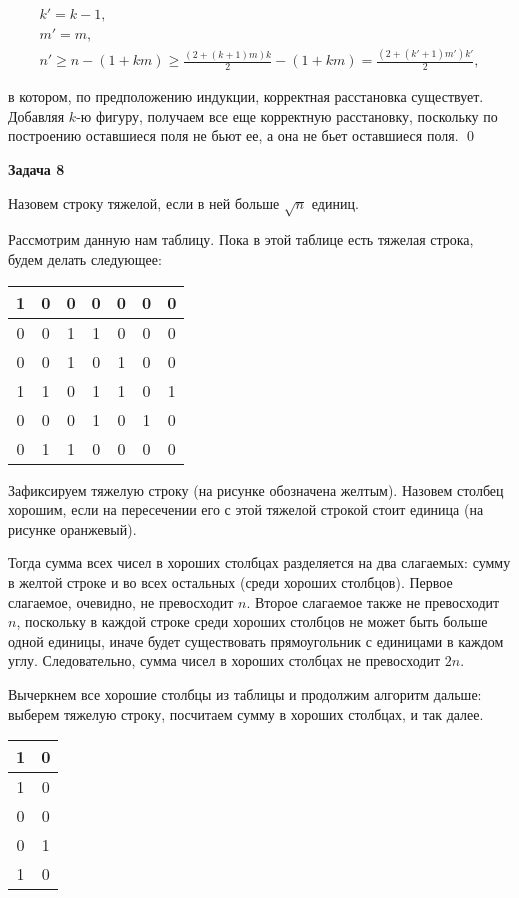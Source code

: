 		\begin{gather*}
			k' = k - 1, \\
			m' = m, \\
			n' \ge n - (1+km) \ge \frac{(2+(k+1)m)k}{2} - (1+km) = \frac{(2+(k'+1)m')k'}{2},
		\end{gather*}

		в котором, по предположению индукции, корректная расстановка существует. Добавляя $k$-ю фигуру, получаем все еще корректную расстановку, поскольку по построению оставшиеся поля не бьют ее, а она не бьет оставшиеся поля. \qed


	\begin{center}
    \textbf{Задача 8}
\end{center}
		Назовем строку тяжелой, если в ней больше $\sqrt{n}$ единиц.

		Рассмотрим данную нам таблицу. Пока в этой таблице есть тяжелая строка, будем делать следующее:

		\begin{tabular}{|c|c|c|c|c|c|c|}
			\hline
			1 & 0 & 0 & 0 & 0 & 0 & 0 \\
			\hline
			0 & 0 & 1 & 1 & 0 & 0 & 0 \\
			\hline
			0 & 0 & 1 & 0 & 1 & 0 & 0 \\
			\hline
			\rowcolor{yellow}
			1 & 1 & 0 & 1 & 1 & 0 & 1 \\
			\hline
			0 & 0 & 0 & 1 & 0 & 1 & 0 \\
			\hline
			0 & 1 & 1 & 0 & 0 & 0 & 0 \\
			\hline
		\end{tabular}

		Зафиксируем тяжелую строку (на рисунке обозначена желтым). Назовем столбец хорошим, если на пересечении его с этой тяжелой строкой стоит единица (на рисунке оранжевый).

		Тогда сумма всех чисел в хороших столбцах разделяется на два слагаемых: сумму в желтой строке и во всех остальных (среди хороших столбцов). Первое слагаемое, очевидно, не превосходит $n$. Второе слагаемое также не превосходит $n$, поскольку в каждой строке среди хороших столбцов не может быть больше одной единицы, иначе будет существовать прямоугольник с единицами в каждом углу. Следовательно, сумма чисел в хороших столбцах не превосходит $2n$.

		Вычеркнем все хорошие столбцы из таблицы и продолжим алгоритм дальше: выберем тяжелую строку, посчитаем сумму в хороших столбцах, и так далее.

		\begin{tabular}{|c|c|}
			\hline
			1 & 0 \\
			\hline
			1 & 0 \\
			\hline
			\rowcolor{yellow}
			0 & 0 \\
			\hline
			0 & 1 \\
			\hline
			1 & 0 \\
			\hline
		\end{tabular}

